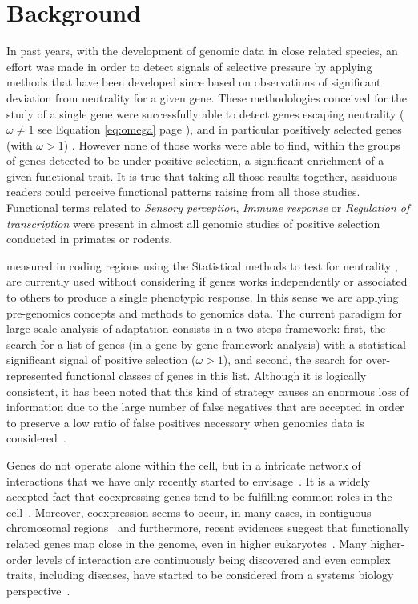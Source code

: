 

\section{Background}

In past years, with the development of genomic data in close related species, an effort was made in order to detect signals of selective pressure by applying methods that have been developed since \cite{Kimura1985} based on observations of significant deviation from neutrality for a given gene. These methodologies conceived for the study of a single gene were successfully able to detect genes escaping neutrality ($\omega \ne 1$ see Equation \ref{eq:omega} page \pageref{eq:omega}), and in particular positively selected genes (with $\omega > 1$)  \cite{Arbiza2006,Bakewell2007,Bustamante2005,Clark2003,Nielsen2005}. However none of those works were able to find, within the groups of genes detected to be under positive selection, a significant enrichment of a given functional trait. It is true that taking all those results together, assiduous readers could perceive functional patterns raising from all those studies. Functional terms related to \textit{Sensory perception}, \textit{Immune response} or \textit{Regulation of transcription} were present in almost all genomic studies of positive selection conducted in primates or rodents.


measured in coding regions using the  Statistical methods to test for neutrality \cite{Nielsen2001}, are currently used without considering if genes works independently or associated to others to produce a single phenotypic response. In this sense we are applying pre-genomics concepts and methods to genomics data. The current paradigm for large scale analysis of adaptation consists in a two steps framework: first, the search for a list of genes (in a gene-by-gene framework analysis) with a statistical significant signal of positive selection ($\omega > 1$), and second, the search for over-represented functional classes of genes in this list. Although it is logically consistent, it has been noted that this kind of strategy causes an enormous loss of information due to the large number of false negatives that are accepted in order to preserve a low ratio of false positives necessary when genomics data is considered~\cite{Al-Shahrour2007,Al-Shahrour2005a,Al-Shahrour2006,Subramanian2005}.

Genes do not operate alone within the cell, but in a intricate network of interactions that we have only recently started to envisage~\cite{Stelzl2005}. It is a widely accepted fact that coexpressing genes tend to be fulfilling common roles in the cell~\cite{Lee2003}. Moreover, coexpression seems to occur, in many cases, in contiguous chromosomal regions~\cite{Caron2001} and furthermore, recent evidences suggest that functionally related genes map close in the genome, even in higher eukaryotes~\cite{Hurst2004}. Many higher-order levels of interaction are continuously being discovered and even complex traits, including diseases, have started to be considered from a systems biology perspective~\cite{Ideker2008,Vamathevan2008}.

